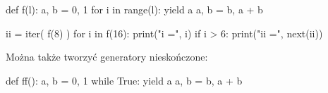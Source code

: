 \begin{CodeFrame*}[python]{}
def f(l):
    a, b = 0, 1
    for i in range(l):
        yield a
        a, b = b, a + b

ii = iter( f(8) )
for i in f(16):
    print("i =", i)
    if i > 6:
        print("ii =", next(ii))
\end{CodeFrame*}

Można także tworzyć generatory nieskończone:

\begin{CodeFrame*}[python]{}
def ff():
    a, b = 0, 1
    while True:
      yield a
      a, b = b, a + b
\end{CodeFrame*}

